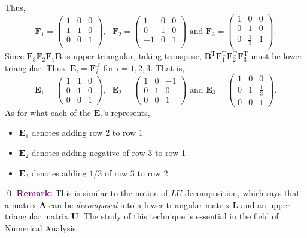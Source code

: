 \documentclass{article}
\begin{document}
Thus, \[{{\mathbf{F}}_{1}}=\left( \begin{matrix}
   1 & 0 & 0  \\
   1 & 1 & 0  \\
   0 & 0 & 1  \\
\end{matrix} \right),\text{ }{{\mathbf{F}}_{2}}=\left( \begin{matrix}
   1 & 0 & 0  \\
   0 & 1 & 0  \\
   -1 & 0 & 1  \\
\end{matrix} \right)\text{ and }{{\mathbf{F}}_{3}}=\left( \begin{matrix}
   1 & 0 & 0  \\
   0 & 1 & 0  \\
   0 & \frac{1}{3} & 1  \\
\end{matrix} \right).\]
Since $\mathbf{F}_3\mathbf{F}_2\mathbf{F}_1\mathbf{B}$ is upper triangular, taking transpose, $\mathbf{B}^\text{T}\mathbf{F}_1^\text{T}\mathbf{F}_2^\text{T}\mathbf{F}_3^\text{T}$ must be lower triangular. Thus, $\mathbf{E}_i=\mathbf{F}_i^\text{T}$ for $i=1,2,3$. That is, \[\mathbf{E}_1=\begin{pmatrix}1&1&0\\0&1&0\\0&0&1
\end{pmatrix}, \text{ }\mathbf{E}_2=\begin{pmatrix}1&0&-1\\0&1&0\\0&0&1
\end{pmatrix}\text{ and }\mathbf{E}_3=\begin{pmatrix}1&0&0\\0&1&\frac{1}{3}\\0&0&1
\end{pmatrix}.\]
As for what each of the $\mathbf{E}_i$'s represents,
\begin{itemize}
    \item $\mathbf{E}_1$ denotes adding row 2 to row 1
    \item $\mathbf{E}_2$ denotes adding negative of row 3 to row 1
    \item $\mathbf{E}_3$ denotes adding $1/3$ of row 3 to row 2
\end{itemize} \qed 
\newline
\newline\textbf{\textcolor{purple}{Remark:}} This is similar to the notion of $LU$ decomposition, which says that a matrix $\mathbf{A}$ can be \textit{decomposed} into a lower triangular matrix $\mathbf{L}$ and an upper triangular matrix $\mathbf{U}$. The study of this technique is essential in the field of Numerical Analysis.
\end{document}
